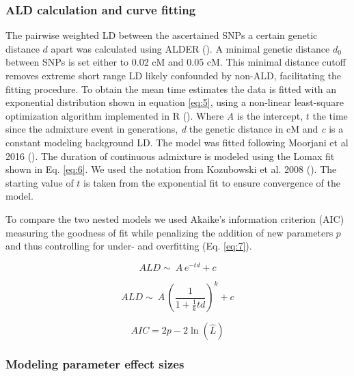 \documentclass[]{article}
\begin{document}
\subsubsection{ALD calculation and curve fitting}\label{ALD calculation and curve fitting}

The pairwise weighted LD between the ascertained SNPs a certain genetic
distance \(d\) apart was calculated using ALDER
(\cite{loh_inferring_2013}). A minimal genetic distance \(d_0\) between
SNPs is set either to 0.02 cM and 0.05 cM. This minimal distance cutoff
removes extreme short range LD likely confounded by non-ALD,
facilitating the fitting procedure. To obtain the mean time estimates
the data is fitted with an exponential distribution shown in equation
\ref{eq:5}, using a non-linear least-square optimization algorithm
implemented in R (\cite{R_Core_Team_2019}). Where \emph{A} is the
intercept, \(t\) the time since the admixture event in generations,
\emph{d} the genetic distance in cM and \emph{c} is a constant modeling
background LD. The model was fitted following Moorjani et al 2016
(\cite{moorjani_genetic_2016}). The duration of continuous admixture is
modeled using the Lomax fit shown in Eq. \ref{eq:6}. We used the
notation from Kozubowski et al. 2008 (\cite{Kozubowski_Testing_2008}).
The starting value of \(t\) is taken from the exponential fit to ensure
convergence of the model.

To compare the two nested models we used Akaike's information criterion
(AIC) measuring the goodness of fit while penalizing the addition of new
parameters \(p\) and thus controlling for under- and overfitting (Eq.
\ref{eq:7}).

\begin{equation}
\label{eq:5}
ALD \sim\ A\,e^{-td}+c
\end{equation}

\begin{equation}
\label{eq:6}
ALD \sim\ A\,\left( \frac{1}{1 + \frac{1}{k}td}\right) ^k+c
\end{equation}

\begin{equation}
\label{eq:7}
AIC = 2p - 2\ln(\hat{L})
\end{equation}

\subsubsection{Modeling parameter effect sizes}\label{modeling prameter effect sizes}
\end{document}
